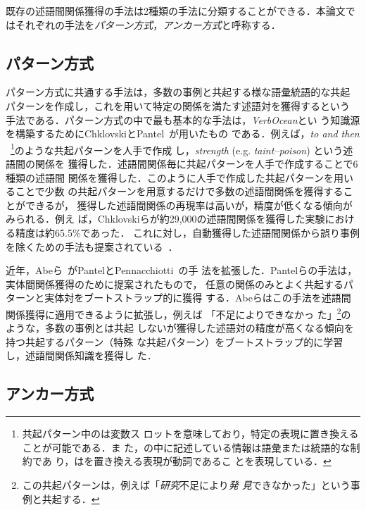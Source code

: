 \documentclass[japanese]{jnlp_1.4}
\begin{document}
既存の述語間関係獲得の手法は2種類の手法に分類することができる．本論文で
はそれぞれの手法を\emph{パターン方式}，\emph{アンカー方式}と呼称する．


\subsection{パターン方式}
\label{ssec:related_patt}

パターン方式に共通する手法は，多数の事例と共起する様な語彙統語的な共起
パターンを作成し，これを用いて特定の関係を満たす述語対を獲得するという
手法である．パターン方式の中で最も基本的な手法は，\emph{VerbOcean}とい
う知識源を構築するためにChklovskiとPantel~\cite{chklovski}が用いたもの
である．例えば，\emph{to  and then
  }~\footnote{共起パターン中の\bracket{~}は変数ス
  ロットを意味しており，特定の表現に置き換えることが可能である．ま
  た，\bracket{~}の中に記述している情報は語彙または統語的な制約であ
  り，は\bracket{~}を置き換える表現が動詞であるこ
  とを表現している．}のような共起パターンを人手で作成
し，\emph{strength} (e.g. \emph{taint--poison}) という述語間の関係を
獲得した．述語間関係毎に共起パターンを人手で作成することで6種類の述語間
関係を獲得した．このように人手で作成した共起パターンを用いることで少数
の共起パターンを用意するだけで多数の述語間関係を獲得することができるが，
獲得した述語間関係の再現率は高いが，精度が低くなる傾向がみられる．例え
ば，Chklovskiらが約29,000の述語間関係を獲得した実験における精度は約65.5\%であった．
これに対し，自動獲得した述語間関係から誤り事例を除くための手法も提案されている~\cite{chklovski,torisawa:NAACL,zanzotto:06,inui:DS03}．

近年，Abeら~\cite{abe:08}がPantelとPennacchiotti~\cite{pantel2006}の手
法を拡張した．Pantelらの手法は，実体間関係獲得のために提案されたもので，
任意の関係のみとよく共起するパターンと実体対をブートストラップ的に獲得
する．Abeらはこの手法を述語間関係獲得に適用できるように拡張し，例えば
「不足によりできなかっ
た」\footnote{この共起パターンは，例えば「\emph{研究}不足により\emph{発
    見}できなかった」という事例と共起する．}のような，多数の事例とは共起
しないが獲得した述語対の精度が高くなる傾向を持つ共起するパターン（特殊
な共起パターン）をブートストラップ的に学習し，述語間関係知識を獲得し
た．


\subsection{アンカー方式}
\label{ssec:related_anc}
\end{document}
